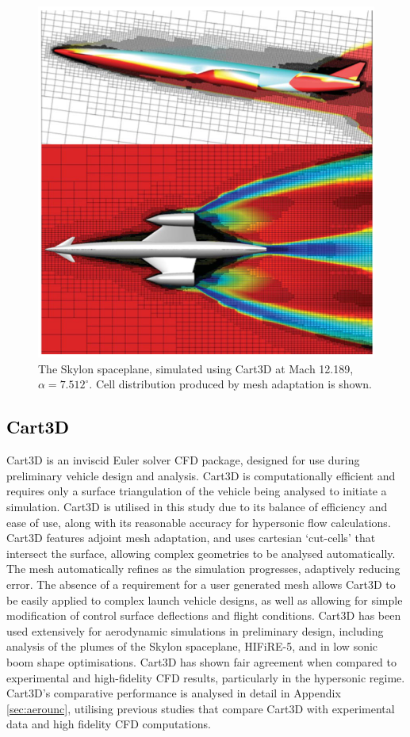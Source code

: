 \begin{figure}[!ht]
	\centering
	\includegraphics[width=0.6\linewidth]{figures/2_literature-review/Skylon-Cart3D}
	\caption{The Skylon spaceplane, simulated using Cart3D at Mach 12.189, $\alpha=7.512^\circ$\cite{Mehta2016}. Cell distribution produced by mesh adaptation is shown.}
	\label{fig:Skylon-Cart3D}
\end{figure}

\textcolor{black}{
\subsection{Cart3D}\label{sec:Cart3d}
}
\noindent
Cart3D is an inviscid Euler solver CFD package, designed for use during preliminary vehicle design and analysis\cite{Almosnino2016}. Cart3D is computationally efficient and requires only a surface triangulation of the vehicle being analysed to initiate a simulation. Cart3D is utilised in this study due to its balance of efficiency and ease of use, along with its reasonable accuracy for hypersonic flow calculations\cite{Abeynayake2013a,Ward2018,Kiris2011}. Cart3D features adjoint mesh adaptation, and uses cartesian `cut-cells' that intersect the surface, allowing complex geometries to be analysed automatically. The mesh automatically refines as the simulation progresses, adaptively reducing error. The absence of a requirement for a user generated mesh allows Cart3D to be easily applied to complex launch vehicle designs, as well as allowing for simple modification of control surface deflections and flight conditions. 
Cart3D has been used extensively for aerodynamic simulations in preliminary design, including analysis of the plumes of the Skylon spaceplane\cite{Mehta2016}, HIFiRE-5\cite{Kimmel2010}, and in low sonic boom shape optimisations\cite{Aftosmis2011}. 
Cart3D has shown fair agreement when compared to experimental and high-fidelity CFD results\cite{Abeynayake2013a,Ward2018,Kiris2011}, particularly in the hypersonic regime. Cart3D's comparative performance is analysed in detail in Appendix \ref{sec:aerounc}, utilising previous studies that compare Cart3D with experimental data and high fidelity CFD computations. 




